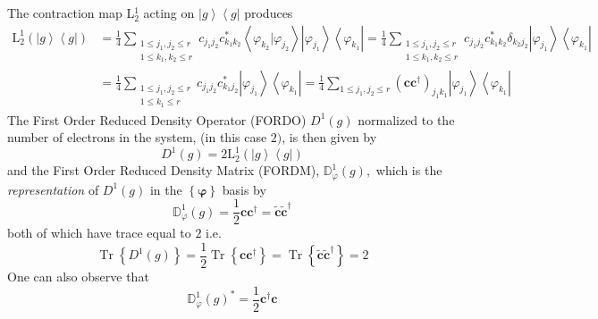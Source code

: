 \documentclass[aps,preprint]{revtex4}%
\begin{document}
The contraction map \textrm{L}$_{2}^{1}$ \cite{Weiner84}\cite{kummar70}%
\cite{Lowdin:1955:QTMa} acting on $\left\vert g\right\rangle \left\langle
g\right\vert $ produces
\begin{align}
\mathrm{L}_{2}^{1}\left(  \left\vert g\right\rangle \left\langle g\right\vert
\right)   &  =\frac{1}{4}\sum_{\substack{1\leq j_{1},j_{2}\leq r\\1\leq
k_{1},k_{2}\leq r}}c_{j_{1}j_{2}}c_{k_{1}k_{2}}^{\ast}\left\langle
\varphi_{k_{2}}|\varphi_{j_{2}}\right\rangle \left\vert \varphi_{j_{1}%
}\right\rangle \left\langle \varphi_{k_{1}}\right\vert =\frac{1}{4}%
\sum_{\substack{1\leq j_{1},j_{2}\leq r\\1\leq k_{1},k_{2}\leq r}%
}c_{j_{1}j_{2}}c_{k_{1}k_{2}}^{\ast}\delta_{k_{2}j_{2}}\left\vert
\varphi_{j_{1}}\right\rangle \left\langle \varphi_{k_{1}}\right\vert
\nonumber\\
&  =\frac{1}{4}\sum_{\substack{1\leq j_{1},j_{2}\leq r\\1\leq k_{1}\leq
r}}c_{j_{1}j_{2}}c_{k_{1}j_{2}}^{\ast}\left\vert \varphi_{j_{1}}\right\rangle
\left\langle \varphi_{k_{1}}\right\vert =\frac{1}{4}\sum_{1\leq j_{1}%
,j_{2}\leq r}\left(  \mathbf{cc}^{\dagger}\right)  _{j_{1}k_{1}}\left\vert
\varphi_{j_{1}}\right\rangle \left\langle \varphi_{k_{1}}\right\vert
\end{align}
The First Order Reduced Density Operator (FORDO) $D^{1}\left(  g\right)  $
normalized to the number of electrons in the system, (in this case $2)$, is
then given by
\begin{equation}
D^{1}\left(  g\right)  =2\mathrm{L}_{2}^{1}\left(  \left\vert g\right\rangle
\left\langle g\right\vert \right)
\end{equation}
and the First Order Reduced Density Matrix (FORDM), $\mathbb{D}_{\varphi}%
^{1}\left(  g\right)  ,$ which is the \emph{representation} of $D^{1}\left(
g\right)  $ in the $\left\{  \mathbf{\varphi}\right\}  $ basis by
\begin{equation}
\mathbb{D}_{\varphi}^{1}\left(  g\right)  =\frac{1}{2}\mathbf{cc}^{\dagger
}=\mathbf{\tilde{c}\tilde{c}}^{\dagger}%
\end{equation}
both of which have trace equal to $2$ i.e.
\begin{equation}
\operatorname{Tr}\left\{  D^{1}\left(  g\right)  \right\}  =\frac{1}%
{2}\operatorname{Tr}\left\{  \mathbf{cc}^{\dagger}\right\}  =\operatorname{Tr}%
\left\{  \mathbf{\tilde{c}\tilde{c}}^{\dagger}\right\}  =2
\end{equation}
One can also observe that
\begin{equation}
\mathbb{D}_{\varphi}^{1}\left(  g\right)  ^{\ast}=\frac{1}{2}\mathbf{c}%
^{\dagger}\mathbf{c}%
\end{equation}
\end{document}
